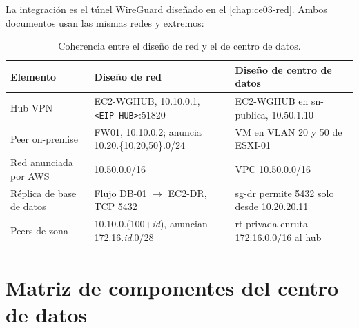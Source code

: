 La integración es el túnel WireGuard diseñado en el \cref{chap:ce03-red}. Ambos
documentos usan las mismas redes y extremos:

\begin{table}[htbp]
\centering
\caption{Coherencia entre el diseño de red y el de centro de datos.}
\label{tab:ce03-coherencia}
\small
\begin{tabularx}{\textwidth}{L{3.6cm}L{4.6cm}X}
\toprule
\textbf{Elemento} & \textbf{Diseño de red} & \textbf{Diseño de centro de datos} \\
\midrule
Hub VPN & EC2-WGHUB, 10.10.0.1, \texttt{<EIP-HUB>}:51820 & EC2-WGHUB en sn-publica, 10.50.1.10 \\
Peer on-premise & FW01, 10.10.0.2; anuncia 10.20.\{10,20,50\}.0/24 & VM en VLAN 20 y 50 de ESXI-01 \\
Red anunciada por AWS & 10.50.0.0/16 & VPC 10.50.0.0/16 \\
Réplica de base de datos & Flujo DB-01 $\rightarrow$ EC2-DR, TCP 5432 & sg-dr permite 5432 solo desde 10.20.20.11 \\
Peers de zona & 10.10.0.(100+\textit{id}), anuncian 172.16.\textit{id}.0/28 & rt-privada enruta 172.16.0.0/16 al hub \\
\bottomrule
\end{tabularx}
\end{table}

\section{Matriz de componentes del centro de datos}

